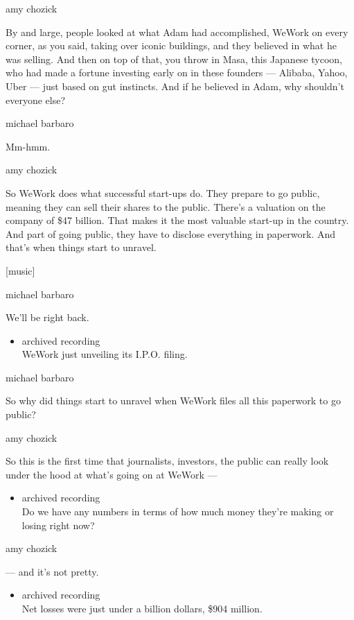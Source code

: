 amy chozick

By and large, people looked at what Adam had accomplished, WeWork on
every corner, as you said, taking over iconic buildings, and they
believed in what he was selling. And then on top of that, you throw in
Masa, this Japanese tycoon, who had made a fortune investing early on in
these founders --- Alibaba, Yahoo, Uber --- just based on gut instincts.
And if he believed in Adam, why shouldn't everyone else?

michael barbaro

Mm-hmm.

amy chozick

So WeWork does what successful start-ups do. They prepare to go public,
meaning they can sell their shares to the public. There's a valuation on
the company of \$47 billion. That makes it the most valuable start-up in
the country. And part of going public, they have to disclose everything
in paperwork. And that's when things start to unravel.

{[}music{]}

michael barbaro

We'll be right back.

\begin{itemize}
\tightlist
\item
  archived recording\\
  WeWork just unveiling its I.P.O. filing.
\end{itemize}

michael barbaro

So why did things start to unravel when WeWork files all this paperwork
to go public?

amy chozick

So this is the first time that journalists, investors, the public can
really look under the hood at what's going on at WeWork ---

\begin{itemize}
\tightlist
\item
  archived recording\\
  Do we have any numbers in terms of how much money they're making or
  losing right now?
\end{itemize}

amy chozick

--- and it's not pretty.

\begin{itemize}
\tightlist
\item
  archived recording\\
  Net losses were just under a billion dollars, \$904 million.
\end{itemize}

